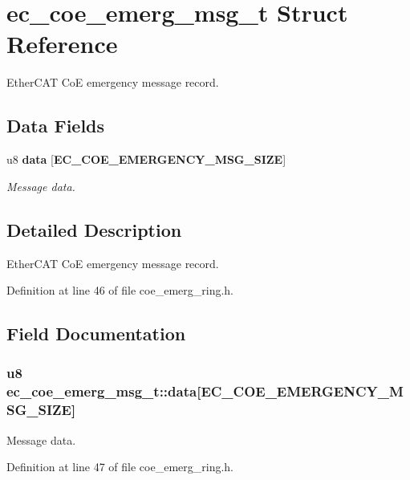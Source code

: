 \section{ec\-\_\-coe\-\_\-emerg\-\_\-msg\-\_\-t Struct Reference}
\label{structec__coe__emerg__msg__t}


Ether\-C\-A\-T Co\-E emergency message record.  


\subsection*{Data Fields}
\begin{DoxyCompactItemize}
\item 
u8 {\bf data} [{\bf E\-C\-\_\-\-C\-O\-E\-\_\-\-E\-M\-E\-R\-G\-E\-N\-C\-Y\-\_\-\-M\-S\-G\-\_\-\-S\-I\-Z\-E}]
\begin{DoxyCompactList}\small\item\em Message data. \end{DoxyCompactList}\end{DoxyCompactItemize}


\subsection{Detailed Description}
Ether\-C\-A\-T Co\-E emergency message record. 

Definition at line 46 of file coe\-\_\-emerg\-\_\-ring.\-h.



\subsection{Field Documentation}
\subsubsection[{data}]{\setlength{\rightskip}{0pt plus 5cm}u8 ec\-\_\-coe\-\_\-emerg\-\_\-msg\-\_\-t\-::data[{\bf E\-C\-\_\-\-C\-O\-E\-\_\-\-E\-M\-E\-R\-G\-E\-N\-C\-Y\-\_\-\-M\-S\-G\-\_\-\-S\-I\-Z\-E}]}\label{structec__coe__emerg__msg__t_a34851e07295140751d9d7edf7dea2561}


Message data. 



Definition at line 47 of file coe\-\_\-emerg\-\_\-ring.\-h.

